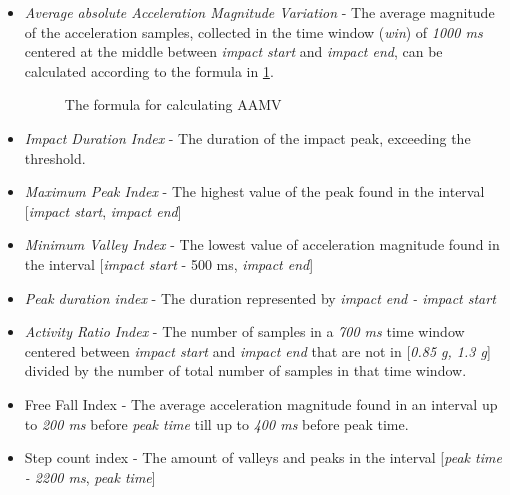 \documentclass[12pt, a4paper, onecolumn]{article}
\begin{document}
	\begin{itemize}
		\item \textit{Average absolute Acceleration Magnitude Variation} - The average magnitude of the acceleration samples, collected in the time window (\textit{win}) of \textit{1000 ms} centered at the middle between \textit{impact start} and \textit{impact end}, can be calculated according to the formula in \ref{fig:aamv-formula}. 
		
		
		\begin{figure}[H]
			\centering
			\caption{The formula for calculating AAMV \cite{piza_uni}}%
			\label{fig:aamv-formula}%
		\end{figure}
		
		\item \textit{Impact Duration Index} - The duration of the impact peak, exceeding the threshold.
		\item \textit{Maximum Peak Index} - The highest value of the peak found in the interval [\textit{impact start}, \textit{impact end}]
		
		\item \textit{Minimum Valley Index} - The lowest value of acceleration magnitude found in the interval [\textit{impact start} - 500 ms, \textit{impact end}]
		
		\item \textit{Peak duration index} - The duration represented by \textit{impact end - impact start}
		\item \textit{Activity Ratio Index} - The number of samples in a \textit{700 ms} time window centered between \textit{impact start} and \textit{impact end} that are not in [\textit{0.85 g, 1.3 g}] divided by the number of total number of samples in that time window.
		
		\item{Free Fall Index} - The average acceleration magnitude found in an interval up to \textit{200 ms} before \textit{peak time} till up to \textit{400 ms} before peak time.
		
		\item{Step count index} - The amount of valleys and peaks in the interval [\textit{peak time - 2200 ms}, \textit{peak time}]
	\end{itemize}
	
\end{document}
